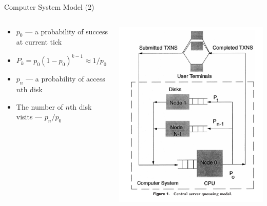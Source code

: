 \documentclass[sans]{beamer}
\begin{document}
\begin{frame}{Computer System Model (2)}
  \begin{columns}

  \begin{column}{.5\linewidth}
    \begin{itemize}
      \item $p_0$ --- a probability of success at current tick
      \item $P_k = p_0 (1 - p_0)^{k - 1} \approx 1/p_0$
      \item $p_n$ --- a probability of access $n$th disk
      \item The number of $n$th disk visits --- $p_n/p_0$
    \end{itemize}
  \end{column}
  \begin{column}{.6\linewidth}
    \includegraphics[width = \linewidth]{images/qnmScheme.png}
  \end{column}

  \end{columns}
\end{frame}
\end{document}
